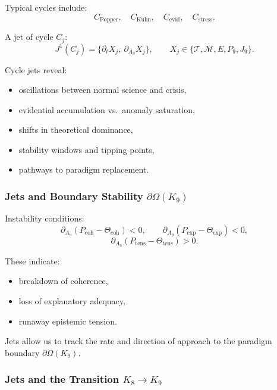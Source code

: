 Typical cycles include:
\[
C_{\mathrm{Popper}},\quad
C_{\mathrm{Kuhn}},\quad
C_{\mathrm{evid}},\quad
C_{\mathrm{stress}}.
\]

A jet of cycle $C_j$:
\[
J^1(C_j)
=
\{\partial_t X_j,\ \partial_{A_9}X_j\},
\qquad 
X_j\in
\{\mathcal{T},\mathcal{M},E,P_9,J_9\}.
\]

Cycle jets reveal:
\begin{itemize}
    \item oscillations between normal science and crisis,
    \item evidential accumulation vs.\ anomaly saturation,
    \item shifts in theoretical dominance,
    \item stability windows and tipping points,
    \item pathways to paradigm replacement.
\end{itemize}


\subsubsection{Jets and Boundary Stability \texorpdfstring{$\partial\Omega(K_9)$}{\partial\Omega(K_9)}}

Instability conditions:
\[
\partial_{A_9}(P_{\mathrm{coh}}-\Theta_{\mathrm{coh}})<0,\qquad
\partial_{A_9}(P_{\mathrm{exp}}-\Theta_{\mathrm{exp}})<0,
\]
\[
\partial_{A_9}(P_{\mathrm{tens}}-\Theta_{\mathrm{tens}})>0.
\]

These indicate:
\begin{itemize}
    \item breakdown of coherence,
    \item loss of explanatory adequacy,
    \item runaway epistemic tension.
\end{itemize}

Jets allow us to track the rate and direction of approach to the
paradigm boundary $\partial\Omega(K_9)$.


\subsubsection{Jets and the Transition \texorpdfstring{$K_8 \to K_9$}{K_8 \to K_9}}

